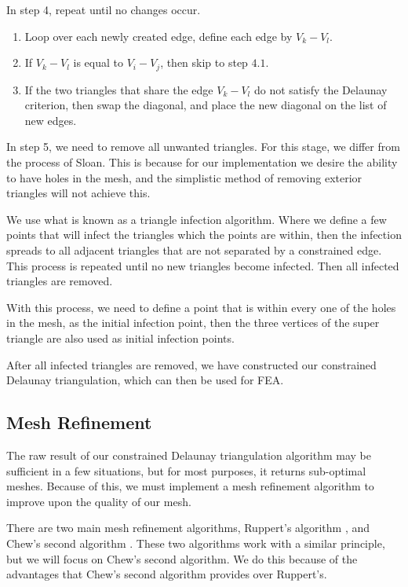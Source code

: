\documentclass[../fem.tex]{subfiles}
\begin{document}
In step 4, repeat until no changes occur.
\begin{enumerate}[label=4.\arabic*.]
  \item Loop over each newly created edge, define each edge by $V_k-V_l$.
  \item If $V_k-V_l$ is equal to $V_i-V_j$, then skip to step $4.1$.
  \item If the two triangles that share the edge $V_k-V_l$ do not satisfy the
    Delaunay criterion, then swap the diagonal, and place the new diagonal on
    the list of new edges.
\end{enumerate}

In step 5, we need to remove all unwanted triangles. For this stage, we differ
from the process of Sloan. This is because for our implementation we desire the
ability to have holes in the mesh, and the simplistic method of removing
exterior triangles will not achieve this.

We use what is known as a triangle infection algorithm. Where we define a few
points that will infect the triangles which the points are within, then the
infection spreads to all adjacent triangles that are not separated by a
constrained edge. This process is repeated until no new triangles become
infected. Then all infected triangles are removed.

With this process, we need to define a point that is within every one of the
holes in the mesh, as the initial infection point, then the three vertices of
the super triangle are also used as initial infection points.

After all infected triangles are removed, we have constructed our constrained
Delaunay triangulation, which can then be used for FEA.

\subsection{Mesh Refinement}%
\label{sub:mesh_refinement}

The raw result of our constrained Delaunay triangulation algorithm may be
sufficient in a few situations, but for most purposes, it returns sub-optimal
meshes. Because of this, we must implement a mesh refinement algorithm to
improve upon the quality of our mesh.

There are two main mesh refinement algorithms, Ruppert's algorithm
\cite{R_REF}, and Chew's second algorithm \cite{C_REF}. These two algorithms
work with a similar principle, but we will focus on Chew's second algorithm. We
do this because of the advantages that Chew's second algorithm provides over
Ruppert's.
\end{document}
